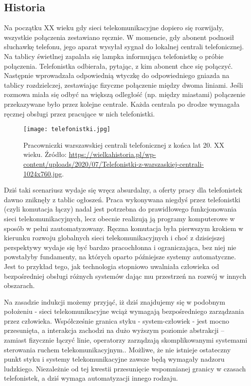 \subsection{Historia}

Na początku XX wieku gdy sieci telekomunikacyjne dopiero się rozwijały, wszystkie połączenia zestawiano ręcznie. W momencie, gdy abonent podnosił słuchawkę telefonu, jego aparat wysyłał sygnał do lokalnej centrali telefonicznej. Na tablicy świetlnej zapalała się lampka informująca telefonistkę o próbie połączenia. Telefonistka odbierała, pytając, z kim abonent chce się połączyć. Następnie wprowadzała odpowiednią wtyczkę do odpowiedniego gniazda na tablicy rozdzielczej, zestawiając fizyczne połączenie między dwoma liniami. Jeśli rozmowa miała się odbyć na większą odległość (np. między miastami) połączenie przekazywane było przez kolejne centrale. Każda centrala po drodze wymagała ręcznej obsługi przez pracujące w nich telefonistki. 

\begin{figure}[!htbp]
    \centering \texttt{[image: telefonistki.jpg]}
    \caption{Pracowniczki warszawskiej centrali telefonicznej z końca lat 20. XX wieku. Źródło: \url{https://wielkahistoria.pl/wp-content/uploads/2020/07/Telefonistki-z-warszaskiej-centrali-1024x760.jpg}.}\label{fig:telefonistki}
\end{figure}

Dziś taki scenariusz wydaje się wręcz absurdalny, a oferty pracy dla telefonistek dawno zniknęły z tablic ogłoszeń. Praca wykonywana niegdyś przez telefonistki (czyli komutacja łączy) nadal jest potrzebna do prawidłowego funkcjonowania sieci telekomunikacyjnych, lecz obecnie realizują ją programy komputerowe w sposób w pełni zautomatyzowany. Ręczna komutacja była pierwszym krokiem w kierunku rozwoju globalnych sieci telekomunikacyjnych i choć z dzisiejszej perspektywy wydaje się być bardzo pracochłonna i ograniczająca, bez niej nie powstałyby fundamenty, na których oparto późniejsze systemy automatyczne. Jest to przykład tego, jak technologia stopniowo uwalniała człowieka od bezpośredniej obsługi różnych systemów dając mu przestrzeń na rozwój w innych obszarach.

Na zasadzie indukcji możemy przyjąć, iż dziś znajdujemy się w podobnym położeniu - sieci telekomunikacyjne wciąż wymagają bezpośredniego zarządzania przez człowieka. Współcześnie granica styku - system-człowiek - jest mocno przesunięta, a interakcja zachodzi na dużo wyższym poziomie abstrakcji – zamiast fizycznie łączyć linie, operatorzy zarządzają skomplikowanymi systemami sterowania ruchem telekomunikacyjnym.. Możliwe, że nie istnieje ostateczny punkt styku i systemy telekomunikacyjne zawsze będą wymagały nadzoru ludzkiego. Niezależnie od tej kwestii przesunięcie wspomnianej granicy w czasach telefonistek, a dziś wymaga automatyzacji innego rodzaju. 

